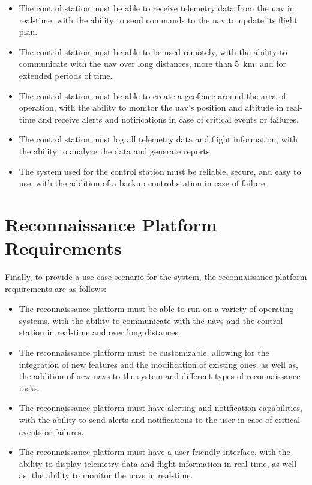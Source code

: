 \begin{itemize}
  \item The control station must be able to receive telemetry data from the \gls{uav} in real-time, with the ability to send commands to the \gls{uav} to update its flight plan.

  \item The control station must be able to be used remotely, with the ability to communicate with the \gls{uav} over long distances, more than \SI{5}{\kilo\meter}, and for extended periods of time.

  \item The control station must be able to create a geofence around the area of operation, with the ability to monitor the \gls{uav}'s position and altitude in real-time and receive alerts and notifications in case of critical events or failures.

  \item The control station must log all telemetry data and flight information, with the ability to analyze the data and generate reports.

  \item The system used for the control station must be reliable, secure, and easy to use, with the addition of a backup control station in case of failure.
\end{itemize}

\section{Reconnaissance Platform Requirements}

Finally, to provide a use-case scenario for the system, the reconnaissance platform requirements are as follows:

\begin{itemize}
  \item The reconnaissance platform must be able to run on a variety of operating systems, with the ability to communicate with the \glspl{uav} and the control station in real-time and over long distances.

  \item The reconnaissance platform must be customizable, allowing for the integration of new features and the modification of existing ones, as well as, the addition of new \glspl{uav} to the system and different types of reconnaissance tasks.

  \item The reconnaissance platform must have alerting and notification capabilities, with the ability to send alerts and notifications to the user in case of critical events or failures.

  \item The reconnaissance platform must have a user-friendly interface, with the ability to display telemetry data and flight information in real-time, as well as, the ability to monitor the \glspl{uav} in real-time.
\end{itemize}
